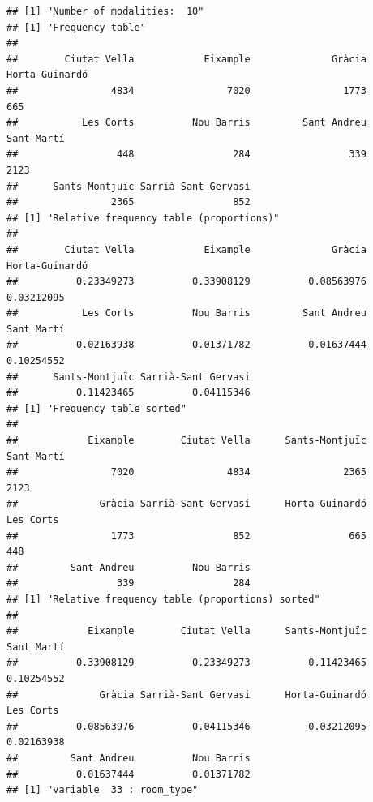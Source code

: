 \begin{verbatim}
## [1] "Number of modalities:  10"
## [1] "Frequency table"
## 
##        Ciutat Vella            Eixample              Gràcia      Horta-Guinardó 
##                4834                7020                1773                 665 
##           Les Corts          Nou Barris         Sant Andreu          Sant Martí 
##                 448                 284                 339                2123 
##      Sants-Montjuïc Sarrià-Sant Gervasi 
##                2365                 852 
## [1] "Relative frequency table (proportions)"
## 
##        Ciutat Vella            Eixample              Gràcia      Horta-Guinardó 
##          0.23349273          0.33908129          0.08563976          0.03212095 
##           Les Corts          Nou Barris         Sant Andreu          Sant Martí 
##          0.02163938          0.01371782          0.01637444          0.10254552 
##      Sants-Montjuïc Sarrià-Sant Gervasi 
##          0.11423465          0.04115346 
## [1] "Frequency table sorted"
## 
##            Eixample        Ciutat Vella      Sants-Montjuïc          Sant Martí 
##                7020                4834                2365                2123 
##              Gràcia Sarrià-Sant Gervasi      Horta-Guinardó           Les Corts 
##                1773                 852                 665                 448 
##         Sant Andreu          Nou Barris 
##                 339                 284 
## [1] "Relative frequency table (proportions) sorted"
## 
##            Eixample        Ciutat Vella      Sants-Montjuïc          Sant Martí 
##          0.33908129          0.23349273          0.11423465          0.10254552 
##              Gràcia Sarrià-Sant Gervasi      Horta-Guinardó           Les Corts 
##          0.08563976          0.04115346          0.03212095          0.02163938 
##         Sant Andreu          Nou Barris 
##          0.01637444          0.01371782 
## [1] "variable  33 : room_type"
\end{verbatim}

